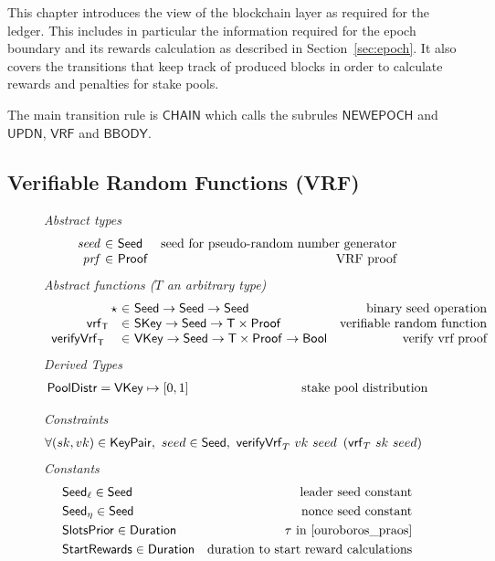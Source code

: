 This chapter introduces the view of the blockchain layer as required for the
ledger. This includes in particular the information required for the epoch
boundary and its rewards calculation as described in Section~\ref{sec:epoch}. It
also covers the transitions that keep track of produced blocks in order to
calculate rewards and penalties for stake pools.

The main transition rule is $\mathsf{CHAIN}$ which calls the subrules
$\mathsf{NEWEPOCH}$ and $\mathsf{UPDN}$, $\mathsf{VRF}$ and $\mathsf{BBODY}$.

\subsection{Verifiable Random Functions (VRF)}
\label{sec:defs-vrf}

\begin{figure}[htb]
  \emph{Abstract types}
  \begin{equation*}
    \begin{array}{r@{~\in~}lr}
      \var{seed} & \Seed  & \text{seed for pseudo-random number generator}\\
      \var{prf} & \Proof  & \text{VRF proof}\\
    \end{array}
  \end{equation*}
  \emph{Abstract functions ($T$ an arbitrary type)}
  \begin{equation*}
    \begin{array}{r@{~\in~}lr}
      \seedOp & \Seed \to \Seed \to \Seed & \text{binary seed operation} \\
      \vrf{\T}{}{} & \SKey \to \Seed \to \T\times\Proof
                   & \text{verifiable random function} \\
      \verifyVrf{\T}{}{}{} & \VKey \to \Seed \to \T\times\Proof \to \Bool
                           & \text{verify vrf proof} \\
    \end{array}
  \end{equation*}
  \emph{Derived Types}
  \begin{align*}
    \PoolDistr = \VKey \mapsto [0, 1] \text{ \hspace{3cm}stake pool distribution}
  \end{align*}

  \emph{Constraints}
  \begin{align*}
    & \forall (sk, vk) \in \mathsf{KeyPair},~ seed \in \mathsf{Seed},~
    \mathsf{verifyVrf}_{T} ~ vk ~ seed ~\left(\mathsf{vrf}_{T} ~ sk ~ seed\right)
  \end{align*}
  \emph{Constants}
  \begin{align*}
    & \mathsf{Seed}_\ell \in \mathsf{Seed} & \text{leader seed constant} \\
    & \mathsf{Seed}_\eta \in \mathsf{Seed} & \text{nonce seed constant}\\
    & \mathsf{SlotsPrior} \in \mathsf{Duration} & \tau\text{ in \cite{ouroboros_praos}}\\
    & \mathsf{StartRewards} \in \mathsf{Duration} & \text{duration to start reward calculations}\\
  \end{align*}


\end{figure}
